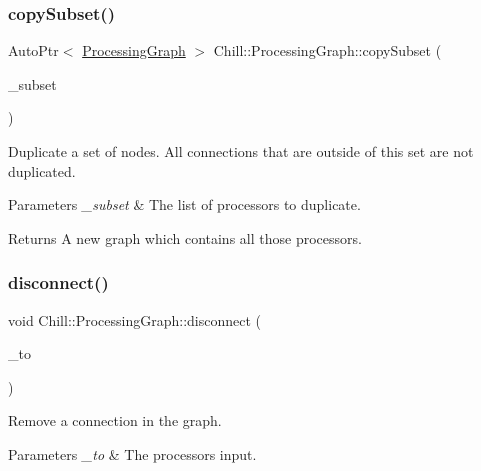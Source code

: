 \subsubsection{\texorpdfstring{copy\+Subset()}{copySubset()}}
{\footnotesize\ttfamily Auto\+Ptr$<$ \mbox{\hyperlink{class_chill_1_1_processing_graph}{Processing\+Graph}} $>$ Chill\+::\+Processing\+Graph\+::copy\+Subset (\begin{DoxyParamCaption}\item[{const std\+::vector$<$ Auto\+Ptr$<$ \mbox{\hyperlink{class_chill_1_1_processor}{Processor}} $>$$>$ \&}]{\+\_\+subset }\end{DoxyParamCaption})}

Duplicate a set of nodes. All connections that are outside of this set are not duplicated. 
\begin{DoxyParams}{Parameters}
{\em \+\_\+subset} & The list of processors to duplicate. \\
\hline
\end{DoxyParams}
\begin{DoxyReturn}{Returns}
A new graph which contains all those processors. 
\end{DoxyReturn}
\mbox{\label{class_chill_1_1_processing_graph_a9f3ccb8d44f098a9728059f839e86580}} 
\subsubsection{\texorpdfstring{disconnect()}{disconnect()}\hspace{0.1cm}{\footnotesize\ttfamily [1/2]}}
{\footnotesize\ttfamily void Chill\+::\+Processing\+Graph\+::disconnect (\begin{DoxyParamCaption}\item[{Auto\+Ptr$<$ \mbox{\hyperlink{class_chill_1_1_processor_input}{Processor\+Input}} $>$ \&}]{\+\_\+to }\end{DoxyParamCaption})\hspace{0.3cm}{\ttfamily [static]}}

Remove a connection in the graph. 
\begin{DoxyParams}{Parameters}
{\em \+\_\+to} & The processor\textquotesingle{}s input. \\
\hline
\end{DoxyParams}
\mbox{\label{class_chill_1_1_processing_graph_a907f3d1f85ba8a59ecd5ab0aa8b353ee}} 

